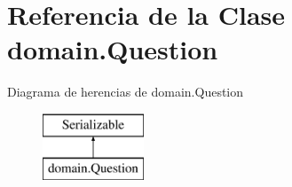 \hypertarget{classdomain_1_1Question}{}\section{Referencia de la Clase domain.\+Question}
\label{classdomain_1_1Question}
Diagrama de herencias de domain.\+Question\begin{figure}[H]
\begin{center}
\leavevmode
\includegraphics[height=2.000000cm]{classdomain_1_1Question}
\end{center}
\end{figure}
